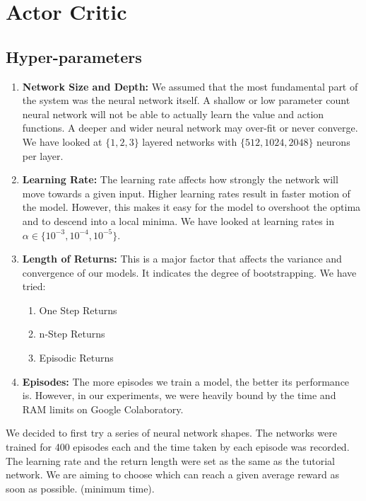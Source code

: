 \documentclass[A4]{article}
\begin{document}
    \setcounter{section}{1}


    \section{Actor Critic}\label{sec:actor-critic}

    \subsection{Hyper-parameters}\label{subsec:ac_hyperparams}
    \begin{enumerate}
        \item \textbf{Network Size and Depth:} We assumed that the most fundamental part of the system was the neural network itself.
        A shallow or low parameter count neural network will not be able to actually learn the value and action functions.
        A deeper and wider neural network may over-fit or never converge.
        We have looked at $\{1,2,3\}$ layered networks with $\{512, 1024, 2048\}$ neurons per layer.

        \item \textbf{Learning Rate:} The learning rate affects how strongly the network will move towards a given input.
        Higher learning rates result in faster motion of the model.
        However, this makes it easy for the model to overshoot the optima and to descend into a local minima.
        We have looked at learning rates in $\alpha \in \{10^{-3}, 10^{-4}, 10^{-5}\}$.

        \item \textbf{Length of Returns:} This is a major factor that affects the variance and convergence of our models.
        It indicates the degree of bootstrapping.
        We have tried:
        \begin{enumerate}
            \item One Step Returns
            \item n-Step Returns
            \item Episodic Returns
        \end{enumerate}
        \item \textbf{Episodes:} The more episodes we train a model, the better its performance is.
        However, in our experiments, we were heavily bound by the time and RAM limits on Google Colaboratory.
    \end{enumerate}
    We decided to first try a series of neural network shapes.
    The networks were trained for 400 episodes each and the time taken by each episode was recorded.
    The learning rate and the return length were set as the same as the tutorial network.
    We are aiming to choose which can reach a given average reward as soon as possible.
    (minimum time).
\end{document}
